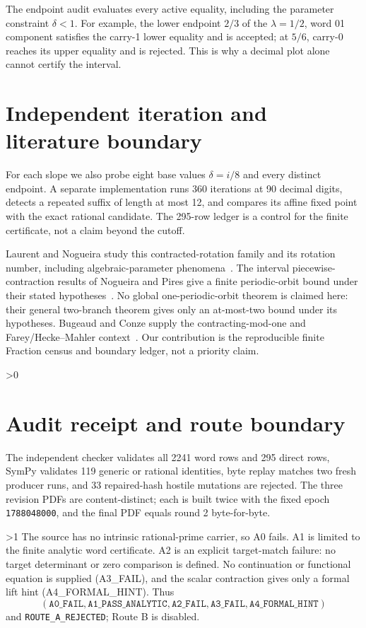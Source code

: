\documentclass[10pt]{article}
\begin{document}
The endpoint audit evaluates every active equality, including the parameter
constraint \(\delta<1\).  For example, the lower endpoint \(2/3\) of the
\(\lambda=1/2\), word 01 component satisfies the carry-1 lower equality and is
accepted; at \(5/6\), carry-0 reaches its upper equality and is rejected.
This is why a decimal plot alone cannot certify the interval.

\section{Independent iteration and literature boundary}
For each slope we also probe eight base values \(\delta=i/8\) and every
distinct endpoint.  A separate implementation runs 360 iterations at 90
decimal digits, detects a repeated suffix of length at most 12, and compares
its affine fixed point with the exact rational candidate.  The 295-row ledger
is a control for the finite certificate, not a claim beyond the cutoff.

Laurent and Nogueira study this contracted-rotation family and its rotation
number, including algebraic-parameter phenomena~\cite{laurent2018}.  The
interval piecewise-contraction results of Nogueira and Pires give a finite
periodic-orbit bound under their stated hypotheses~\cite{nogueira2015}.  No
global one-periodic-orbit theorem is claimed here: their general two-branch
theorem gives only an at-most-two bound under its hypotheses.
Bugeaud and Conze supply the contracting-mod-one and Farey/Hecke--Mahler
context~\cite{bugeaud1999}.  Our contribution is the reproducible finite
Fraction census and boundary ledger, not a priority claim.

\ifnum\CRevisionRound>0
\section{Audit receipt and route boundary}
The independent checker validates all 2241 word rows and 295 direct rows,
SymPy validates 119 generic or rational identities, byte replay matches two
fresh producer runs, and 33 repaired-hash hostile mutations are rejected.
The three revision PDFs are content-distinct; each is built twice with the
fixed epoch \texttt{1788048000}, and the final PDF equals round 2 byte-for-byte.
\fi

\ifnum\CRevisionRound>1
The source has no intrinsic rational-prime carrier, so A0 fails.  A1 is limited
to the finite analytic word certificate.  A2 is an explicit target-match
failure: no target determinant or zero comparison is defined.  No continuation
or functional equation is supplied (A3\_FAIL), and the scalar contraction gives
only a formal lift hint (A4\_FORMAL\_HINT).  Thus
\[
(\mathtt{A0\_FAIL},\mathtt{A1\_PASS\_ANALYTIC},\mathtt{A2\_FAIL},
 \mathtt{A3\_FAIL},\mathtt{A4\_FORMAL\_HINT})
\]
and \texttt{ROUTE\_A\_REJECTED}; Route B is disabled.
\fi
\end{document}
